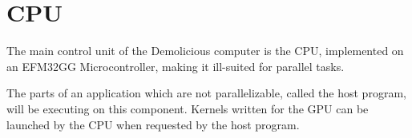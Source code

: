 \documentclass[../main/report.tex]{subfiles}
\begin{document}
\chapter{CPU}

The main control unit of the Demolicious computer is the CPU,
implemented on an EFM32GG Microcontroller, making it ill-suited for parallel tasks.

The parts of an application which are not parallelizable, called the host program, will be executing on this component.
Kernels written for the GPU can be launched by the CPU when requested by the host program.










\end{document}

